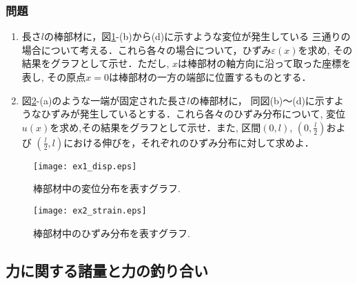 \documentclass[10pt,a4j]{jarticle}
\begin{document}
\subsubsection{問題}
\begin{enumerate}
\item
長さ$l$の棒部材に，図\ref{fig:fig1}-(b)から(d)に示すような変位が発生している
三通りの場合について考える．これら各々の場合について，ひずみ$\varepsilon(x)$を求め, 
その結果をグラフとして示せ．ただし, $x$は棒部材の軸方向に沿って取った座標を表し, 
その原点$x=0$は棒部材の一方の端部に位置するものとする．
\item
図\ref{fig:fig2}-(a)のような一端が固定された長さ$l$の棒部材に，
同図(b)〜(d)に示すようなひずみが発生しているとする．これら各々のひずみ分布について, 
変位$u(x)$を求め,その結果をグラフとして示せ．また, 区間$(0,l)$, $\left(0,\frac{l}{2}\right)$および
$\left(\frac{l}{2},l\right)$における伸びを，それぞれのひずみ分布に対して求めよ．
\end{enumerate}
\begin{figure}[h]
	\begin{center}
	\texttt{[image: ex1\_disp.eps]} 
	\end{center}
	\caption{棒部材中の変位分布を表すグラフ.} 
	\label{fig:fig1}
\end{figure}
\begin{figure}[h]
	\begin{center}
	\texttt{[image: ex2\_strain.eps]} 
	\end{center}
	\caption{棒部材中のひずみ分布を表すグラフ.} 
	\label{fig:fig2}
\end{figure}
\newpage
\subsection{力に関する諸量と力の釣り合い}
\end{document}
